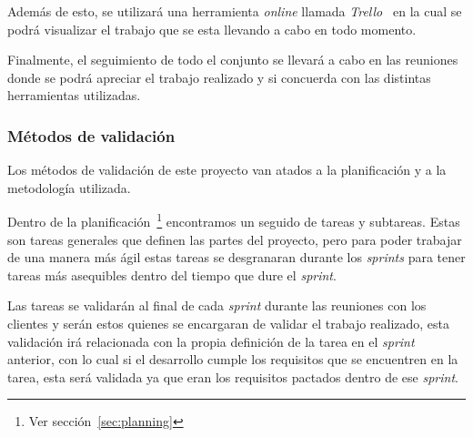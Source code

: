 Además de esto, se utilizará una herramienta \textit{online} llamada \textit{Trello~\cite{trello}} en la cual se podrá visualizar el trabajo que se esta llevando a cabo en todo momento. 

Finalmente, el seguimiento de todo el conjunto se llevará a cabo en las reuniones donde se podrá apreciar el trabajo realizado y si concuerda con las distintas herramientas utilizadas.

\subsubsection{Métodos de validación}
Los métodos de validación de este proyecto van atados a la planificación y a la metodología utilizada.

Dentro de la planificación~\footnote{Ver sección~\ref{sec:planning}} encontramos un seguido de tareas y subtareas. Estas son tareas generales que definen las partes del proyecto, pero para poder trabajar de una manera más ágil estas tareas se desgranaran durante los \textit{sprints} para tener tareas más asequibles dentro del tiempo que dure el \textit{sprint}.

Las tareas se validarán al final de cada \textit{sprint} durante las reuniones con los clientes y serán estos quienes se encargaran de validar el trabajo realizado, esta validación irá relacionada con la propia definición de la tarea en el \textit{sprint} anterior, con lo cual si el desarrollo cumple los requisitos que se encuentren en la tarea, esta será validada ya que eran los requisitos pactados dentro de ese \textit{sprint}.